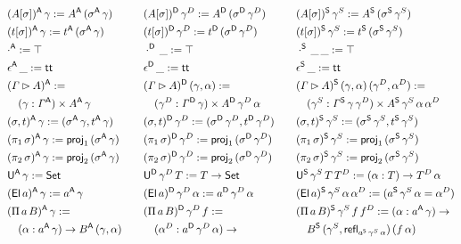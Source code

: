 \documentclass[a4paper,UKenglish,cleveref, autoref]{lipics-v2019}
\begin{document}
\begin{definition}
\begin{alignat*}{10}
    & (A[\sigma])^\A\,\gamma := A^\A\,(\sigma^\A\,\gamma) && && (A[\sigma])^\D\,\gamma^D := A^\D\,(\sigma^\D\,\gamma^D) && && (A[\sigma])^\S\,\gamma^S := A^\S\,(\sigma^\S\,\gamma^S) \\
    & (t[\sigma])^\A\,\gamma := t^\A\,(\sigma^\A\,\gamma) && && (t[\sigma])^\D\,\gamma^D := t^\D\,(\sigma^\D\,\gamma^D) && && (t[\sigma])^\S\,\gamma^S := t^\S\,(\sigma^\S\,\gamma^S) \\
    & \cdot^\A := \top && && \cdot^\D\,\_ := \top && && \cdot^\S\,\_\,\_ := \top \\
    & \epsilon^\A\,\_ := \tt && && \epsilon^\D\,\_ := \tt && && \epsilon^\S\,\_ := \tt \\
    & (\GG\rhd A)^\A := && && (\GG\rhd A)^\D\,(\gamma,\alpha) :=  && && (\GG\rhd A)^\S\,(\gamma,\alpha)\,(\gamma^D,\alpha^D) := \\
    & \hspace{1em} (\gamma:\GG^\A)\times A^\A\,\gamma && && \hspace{1em} (\gamma^D:\GG^\D\,\gamma)\times A^\D\,\gamma^D\,\alpha && && \hspace{1em} (\gamma^S:\GG^\S\,\gamma\,\gamma^D)\times A^\S\,\gamma^S\,\alpha\,\alpha^D \\
    & (\sigma,t)^\A\,\gamma := (\sigma^\A\,\gamma,t^\A\,\gamma) && && (\sigma,t)^\D\,\gamma^D := (\sigma^\D\,\gamma^D,t^\D\,\gamma^D) && && (\sigma,t)^\S\,\gamma^S := (\sigma^\S\,\gamma^S,t^\S\,\gamma^S) \\
    & (\pi_1\,\sigma)^\A\,\gamma := \proj_1\,(\sigma^\A\,\gamma) && && (\pi_1\,\sigma)^\D\,\gamma^D := \proj_1\,(\sigma^\D\,\gamma^D) && && (\pi_1\,\sigma)^\S\,\gamma^S := \proj_1\,(\sigma^\S\,\gamma^S) \\
    & (\pi_2\,\sigma)^\A\,\gamma := \proj_2\,(\sigma^\A\,\gamma) && && (\pi_2\,\sigma)^\D\,\gamma^D := \proj_2\,(\sigma^\D\,\gamma^D) && && (\pi_2\,\sigma)^\S\,\gamma^S := \proj_2\,(\sigma^\S\,\gamma^S) \\
    & \U^\A\,\gamma := \Set && && \U^\D\,\gamma^D\,T := T\ra\Set && && \U^\S\,\gamma^S\,T\,T^D := (\alpha:T)\ra T^D\,\alpha \\
    & (\El\,a)^\A\,\gamma := a^\A\,\gamma && && (\El\,a)^\D\,\gamma^D\,\alpha := a^\D\,\gamma^D\,\alpha && && (\El\,a)^\S\,\gamma^S\,\alpha\,\alpha^D := (a^\S\,\gamma^S\,\alpha = \alpha^D) \\
    & (\Pi\,a\,B)^\A\,\gamma := && && (\Pi\,a\,B)^\D\,\gamma^D\,f := && && (\Pi\,a\,B)^\S\,\gamma^S\,f\,f^D := (\alpha:a^\A\,\gamma)\ra \\
    & \hspace{1em} (\alpha:a^\A\,\gamma)\ra B^\A\,(\gamma,\alpha) && && \hspace{1em}  (\alpha^D:a^\D\,\gamma^D\,\alpha)\ra && && \hspace{1em} B^\S\,(\gamma^S,\refl_{a^\S\,\gamma^S\,\alpha})\,(f\,\alpha)\,\\

\end{alignat*}
\end{definition}
\end{document}

